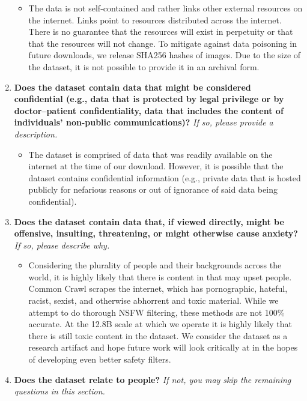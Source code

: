 \begin{enumerate}[label=Q\arabic*]
\begin{itemize}
\item The data is not self-contained and rather links other external resources on the internet. Links point to resources distributed across the internet. There is no guarantee that the resources will exist in perpetuity or that that the resources will not change. To mitigate against data poisoning in future \pool downloads, we release SHA256 hashes of images. Due to the size of the dataset, it is not possible to provide it in an archival form.
\end{itemize}

\item \textbf{Does the dataset contain data that might be considered confidential (e.g., data that is protected by legal privilege or by doctor–patient confidentiality, data that includes the content of individuals’ non-public communications)?} \textit{If so, please provide a description.}

\begin{itemize}
\item The dataset is comprised of data that was readily available on the internet at the time of our download. However, it is possible that the dataset contains confidential information (e.g., private data that is hosted publicly for nefarious reasons or out of ignorance of said data being confidential).
\end{itemize}

\item \textbf{Does the dataset contain data that, if viewed directly, might be offensive, insulting, threatening, or might otherwise cause anxiety?} \textit{If so, please describe why.}

\begin{itemize}
\item Considering the plurality of people and their backgrounds across the world, it is highly likely that there is content in \pool that may upset people. Common Crawl scrapes the internet, which has pornographic, hateful, racist, sexist, and otherwise abhorrent and toxic material. While we attempt to do thorough NSFW filtering, these methods are not 100\% accurate. At the 12.8B scale at which we operate it is highly likely that there is still toxic content in the dataset. We consider the dataset as a research artifact and hope future work will look critically at \pool in the hopes of developing even better safety filters.
\end{itemize}


\item \textbf{Does the dataset relate to people?} \textit{If not, you may skip the remaining questions in this section.}


\end{enumerate}
